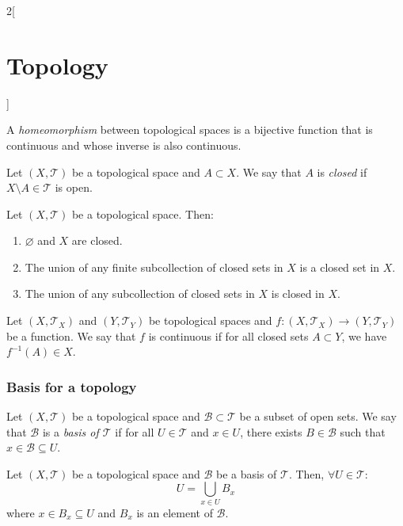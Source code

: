 \documentclass[../../../main.tex]{subfiles}
\begin{document}
\begin{multicols}{2}[\section{Topology}]
\begin{definition}
  \end{definition}
  \begin{definition}
    A \textit{homeomorphism} between topological spaces is a bijective function that is continuous and whose inverse is also continuous.
  \end{definition}
  \begin{definition}
    Let $(X,\mathcal{T})$ be a topological space and $A\subset X$. We say that $A$ is \textit{closed} if $X\setminus A\in\mathcal{T}$ is open.
  \end{definition}
  \begin{prop}
    Let $(X,\mathcal{T})$ be a topological space. Then:
    \begin{enumerate}
      \item $\varnothing$ and $X$ are closed.
      \item The union of any finite subcollection of closed sets in $X$ is a closed set in $X$.
      \item The union of any subcollection of closed sets in $X$ is closed in $X$.
    \end{enumerate}
  \end{prop}
  \begin{definition}
    Let $(X,\mathcal{T}_X)$ and $(Y,\mathcal{T}_Y)$ be topological spaces and $f:(X,\mathcal{T}_X)\rightarrow(Y,\mathcal{T}_Y)$ be a function. We say that $f$ is continuous if for all closed sets $A\subset Y$, we have $f^{-1}(A)\in X$.
  \end{definition}
  \subsubsection*{Basis for a topology}
  \begin{definition}
    Let $(X,\mathcal{T})$ be a topological space and $\mathcal{B}\subset\mathcal{T}$ be a subset of open sets. We say that $\mathcal{B}$ is a \textit{basis of $\mathcal{T}$} if for all $U\in\mathcal{T}$ and $x\in U$, there exists $B\in\mathcal{B}$ such that $x\in\mathcal{B}\subseteq U$.
  \end{definition}
  \begin{prop}
    Let $(X,\mathcal{T})$ be a topological space and $\mathcal{B}$ be a basis of $\mathcal{T}$. Then, $\forall U\in\mathcal{T}$: $$U=\bigcup_{x\in U}B_x$$ where $x\in B_x\subseteq U$ and $B_x$ is an element of $\mathcal{B}$.
  \end{prop}
\end{multicols}
\end{document}
